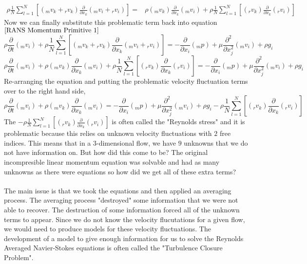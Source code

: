 \begin{align*}
\rho\frac{1}{N}\sum^{N}_{l = 1}\left[({}_{m}v_{k} + {}_{r}v_{k})\frac{\partial }{\partial x_{k}}({}_{m}v_{i} + {}_{r}v_{i})\right] = &
\rho({}_{m}v_{k})\frac{\partial }{\partial x_{k}}({}_{m}v_{i})
+ \rho\frac{1}{N}\sum^{N}_{l = 1}\left[({}_{r}v_{k})\frac{\partial }{\partial x_{k}}({}_{r}v_{i})\right] 
\end{align*}
Now we can finally substitute this problematic term back into equation $\ref{RANS Momentum Primitive 1}$
$$\rho\frac{\partial }{\partial t}({}_{m}v_{i}) + \rho\frac{1}{N}\sum^{N}_{l = 1}\left[({}_{m}v_{k} + {}_{r}v_{k})\frac{\partial }{\partial x_{k}}({}_{m}v_{i} + {}_{r}v_{i})\right]  = -\frac{\partial }{\partial x_{i}}({}_{m}p) + \mu \frac{\partial^{2} }{\partial x_{j}^{2}}({}_{m}v_{i}) + \rho g_{i}$$
$$\rho\frac{\partial }{\partial t}({}_{m}v_{i}) + \rho({}_{m}v_{k})\frac{\partial }{\partial x_{k}}({}_{m}v_{i}) + \rho\frac{1}{N}\sum^{N}_{l = 1}\left[({}_{r}v_{k})\frac{\partial }{\partial x_{k}}({}_{r}v_{i})\right]  = -\frac{\partial }{\partial x_{i}}({}_{m}p) + \mu \frac{\partial^{2} }{\partial x_{j}^{2}}({}_{m}v_{i}) + \rho g_{i}$$
Re-arranging the equation and putting the problematic velocity fluctuation terms over to the right hand side,
$$\rho\frac{\partial }{\partial t}({}_{m}v_{i}) + \rho({}_{m}v_{k})\frac{\partial }{\partial x_{k}}({}_{m}v_{i})  = -\frac{\partial }{\partial x_{i}}({}_{m}p) + \mu \frac{\partial^{2} }{\partial x_{j}^{2}}({}_{m}v_{i}) + \rho g_{i} - \rho\frac{1}{N}\sum^{N}_{l = 1}\left[({}_{r}v_{k})\frac{\partial }{\partial x_{k}}({}_{r}v_{i})\right]$$
The $\displaystyle  - \rho\frac{1}{N}\sum^{N}_{l = 1}\left[({}_{r}v_{k})\frac{\partial }{\partial x_{k}}({}_{r}v_{i})\right]$ is often called the "Reynolds stress" and it is problematic because this relies on unknown velocity fluctuations with $2$ free indices.
This means that in a $3$-dimensional flow, we have $9$ unknowns that we do not have information on.
But how did this come to be?
The original incompresible linear momentum equation was solvable and had as many unknowns as there were equations so how did we get all of these extra terms?
\\~\\The main issue is that we took the equations and then applied an averaging process.
The averaging process "destroyed" some information that we were not able to recover.
The destruction of some information forced all of the unknown terms to appear.
Since we do not know the velocity flucutations for a given flow, we would need to produce models for these velocity fluctuations.
The development of a model to give enough information for us to solve the Reynolds Averaged Navier-Stokes equations is often called the "Turbulence Closure Problem".






